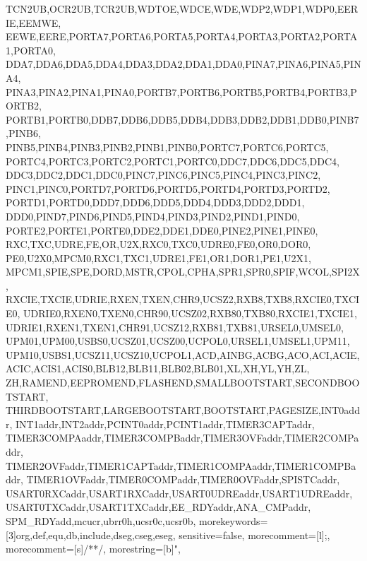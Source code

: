 {{                TCN2UB,OCR2UB,TCR2UB,WDTOE,WDCE,WDE,WDP2,WDP1,WDP0,EERIE,EEMWE,
                EEWE,EERE,PORTA7,PORTA6,PORTA5,PORTA4,PORTA3,PORTA2,PORTA1,PORTA0,
                DDA7,DDA6,DDA5,DDA4,DDA3,DDA2,DDA1,DDA0,PINA7,PINA6,PINA5,PINA4,
                PINA3,PINA2,PINA1,PINA0,PORTB7,PORTB6,PORTB5,PORTB4,PORTB3,PORTB2,
                PORTB1,PORTB0,DDB7,DDB6,DDB5,DDB4,DDB3,DDB2,DDB1,DDB0,PINB7,PINB6,
                PINB5,PINB4,PINB3,PINB2,PINB1,PINB0,PORTC7,PORTC6,PORTC5,
                PORTC4,PORTC3,PORTC2,PORTC1,PORTC0,DDC7,DDC6,DDC5,DDC4,
                DDC3,DDC2,DDC1,DDC0,PINC7,PINC6,PINC5,PINC4,PINC3,PINC2,
                PINC1,PINC0,PORTD7,PORTD6,PORTD5,PORTD4,PORTD3,PORTD2,
                PORTD1,PORTD0,DDD7,DDD6,DDD5,DDD4,DDD3,DDD2,DDD1,
                DDD0,PIND7,PIND6,PIND5,PIND4,PIND3,PIND2,PIND1,PIND0,
                PORTE2,PORTE1,PORTE0,DDE2,DDE1,DDE0,PINE2,PINE1,PINE0,
                RXC,TXC,UDRE,FE,OR,U2X,RXC0,TXC0,UDRE0,FE0,OR0,DOR0,
                PE0,U2X0,MPCM0,RXC1,TXC1,UDRE1,FE1,OR1,DOR1,PE1,U2X1,
                MPCM1,SPIE,SPE,DORD,MSTR,CPOL,CPHA,SPR1,SPR0,SPIF,WCOL,SPI2X,
                RXCIE,TXCIE,UDRIE,RXEN,TXEN,CHR9,UCSZ2,RXB8,TXB8,RXCIE0,TXCIE0,
                UDRIE0,RXEN0,TXEN0,CHR90,UCSZ02,RXB80,TXB80,RXCIE1,TXCIE1,
                UDRIE1,RXEN1,TXEN1,CHR91,UCSZ12,RXB81,TXB81,URSEL0,UMSEL0,
                UPM01,UPM00,USBS0,UCSZ01,UCSZ00,UCPOL0,URSEL1,UMSEL1,UPM11,
                UPM10,USBS1,UCSZ11,UCSZ10,UCPOL1,ACD,AINBG,ACBG,ACO,ACI,ACIE,
                ACIC,ACIS1,ACIS0,BLB12,BLB11,BLB02,BLB01,XL,XH,YL,YH,ZL,
                ZH,RAMEND,EEPROMEND,FLASHEND,SMALLBOOTSTART,SECONDBOOTSTART,
                THIRDBOOTSTART,LARGEBOOTSTART,BOOTSTART,PAGESIZE,INT0addr,
                INT1addr,INT2addr,PCINT0addr,PCINT1addr,TIMER3CAPTaddr,
                TIMER3COMPAaddr,TIMER3COMPBaddr,TIMER3OVFaddr,TIMER2COMPaddr,
                TIMER2OVFaddr,TIMER1CAPTaddr,TIMER1COMPAaddr,TIMER1COMPBaddr,
                TIMER1OVFaddr,TIMER0COMPaddr,TIMER0OVFaddr,SPISTCaddr,
                USART0RXCaddr,USART1RXCaddr,USART0UDREaddr,USART1UDREaddr,
                USART0TXCaddr,USART1TXCaddr,EE_RDYaddr,ANA_CMPaddr,
                SPM_RDYadd,mcucr,ubrr0h,ucsr0c,ucsr0b},
morekeywords=[3]{org,def,equ,db,include,dseg,cseg,eseg},
sensitive=false,
morecomment=[l]{;},
morecomment=[s]{/*}{*/},
morestring=[b]", }
